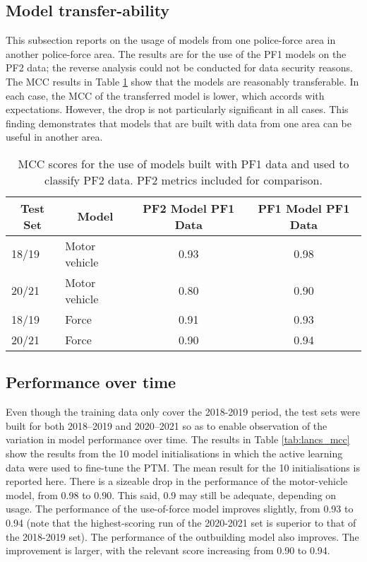 \subsection{Model transfer-ability} This subsection reports on the usage of models from one police-force area in another police-force area. The results are for the use of the PF1 models on the PF2 data; the reverse analysis could not be conducted for data security reasons. The MCC results in Table  \ref{tab:results_transfer} show that the models are reasonably transferable. In each case, the MCC of the transferred model is lower, which accords with expectations. However, the drop is not particularly significant in all cases. This finding demonstrates that models that are built with data from one area can be useful in another area. 



\begin{table}[]
\begin{tabular}{@{}llcc@{}}
\toprule
\multicolumn{1}{c}{Test Set} & \multicolumn{1}{c}{Model} & PF2 Model PF1 Data & PF1 Model PF1 Data \\ \midrule
18/19                        & Motor vehicle             & 0.93                   & 0.98                   \\
20/21                        & Motor vehicle             & 0.80                   & 0.90                   \\
18/19                        & Force                     & 0.91  & 0.93  \\
20/21                        & Force                     & 0.90  & 0.94 \\ \bottomrule
\end{tabular}
\caption[Model metrics. Models tested on alternate police force.]{\label{tab:results_transfer} MCC scores for the use of models built with PF1 data and used to classify PF2 data. PF2 metrics included for comparison. }
\end{table}

\subsection{Performance over time} Even though the training data only cover the 2018-2019 period, the test sets were built for both 2018–2019 and 2020–2021 so as to enable observation of the variation in model performance over time. The results in Table \ref{tab:lancs_mcc}  show the results from the 10 model initialisations in which the active learning data were used to fine-tune the PTM. The mean result for the 10 initialisations is reported here. There is a sizeable drop in the performance of the motor-vehicle model, from 0.98 to 0.90. This said, 0.9 may still be adequate, depending on usage. The performance of the use-of-force model improves slightly, from 0.93 to 0.94 (note that the highest-scoring run of the 2020-2021 set is superior to that of the 2018-2019 set). The performance of the outbuilding model also improves. The improvement is larger, with the relevant score increasing from 0.90 to 0.94.


